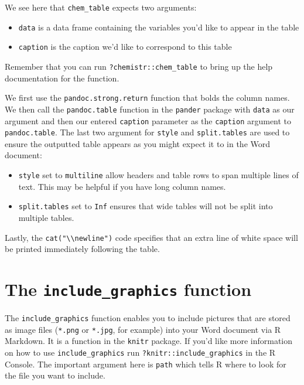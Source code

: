 \documentclass[]{tufte-book}
\providecommand{\tightlist}{%
  \setlength{\itemsep}{0pt}\setlength{\parskip}{0pt}}
\begin{document}
We see here that \texttt{chem\_table} expects two arguments:

\begin{itemize}
\tightlist
\item
  \texttt{data} is a data frame containing the variables you'd like to
  appear in the table
\item
  \texttt{caption} is the caption we'd like to correspond to this table
\end{itemize}

Remember that you can run \texttt{?chemistr::chem\_table} to bring up
the help documentation for the function.

We first use the \texttt{pandoc.strong.return} function that bolds the
column names. We then call the \texttt{pandoc.table} function in the
\texttt{pander} package with \texttt{data} as our argument and then our
entered \texttt{caption} parameter as the \texttt{caption} argument to
\texttt{pandoc.table}. The last two argument for \texttt{style} and
\texttt{split.tables} are used to ensure the outputted table appears as
you might expect it to in the Word document:

\begin{itemize}
\item
  \texttt{style} set to \texttt{multiline} allow headers and table rows
  to span multiple lines of text. This may be helpful if you have long
  column names.
\item
  \texttt{split.tables} set to \texttt{Inf} ensures that wide tables
  will not be split into multiple tables.
\end{itemize}

Lastly, the \texttt{cat("\textbackslash{}\textbackslash{}newline")} code
specifies that an extra line of white space will be printed immediately
following the table.

\section{\texorpdfstring{The \texttt{include\_graphics}
function}{The include\_graphics function}}\label{the-includeux5fgraphics-function}

The \texttt{include\_graphics} function enables you to include pictures
that are stored as image files (\texttt{*.png} or \texttt{*.jpg}, for
example) into your Word document via R Markdown. It is a function in the
\texttt{knitr} package. If you'd like more information on how to use
\texttt{include\_graphics} run \texttt{?knitr::include\_graphics} in the
R Console. The important argument here is \texttt{path} which tells R
where to look for the file you want to include.
\end{document}
